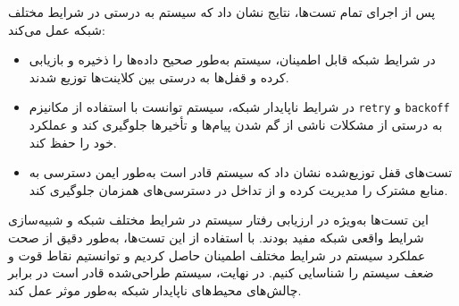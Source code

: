 پس از اجرای تمام تست‌ها، نتایج نشان داد که سیستم به درستی در شرایط مختلف شبکه عمل می‌کند:
\begin{itemize}
    \item در شرایط شبکه قابل اطمینان، سیستم به‌طور صحیح داده‌ها را ذخیره و بازیابی کرده و قفل‌ها به درستی بین کلاینت‌ها توزیع شدند.
    \item در شرایط ناپایدار شبکه، سیستم توانست با استفاده از مکانیزم \texttt{retry} و \texttt{backoff} به درستی از مشکلات ناشی از گم شدن پیام‌ها و تأخیرها جلوگیری کند و عملکرد خود را حفظ کند.
    \item تست‌های قفل توزیع‌شده نشان داد که سیستم قادر است به‌طور ایمن دسترسی به منابع مشترک را مدیریت کرده و از تداخل در دسترسی‌های همزمان جلوگیری کند.
\end{itemize}

این تست‌ها به‌ویژه در ارزیابی رفتار سیستم در شرایط مختلف شبکه و شبیه‌سازی شرایط واقعی شبکه مفید بودند. با استفاده از این تست‌ها، به‌طور دقیق از صحت عملکرد سیستم در شرایط مختلف اطمینان حاصل کردیم و توانستیم نقاط قوت و ضعف سیستم را شناسایی کنیم. در نهایت، سیستم طراحی‌شده قادر است در برابر چالش‌های محیط‌های ناپایدار شبکه به‌طور موثر عمل کند.


